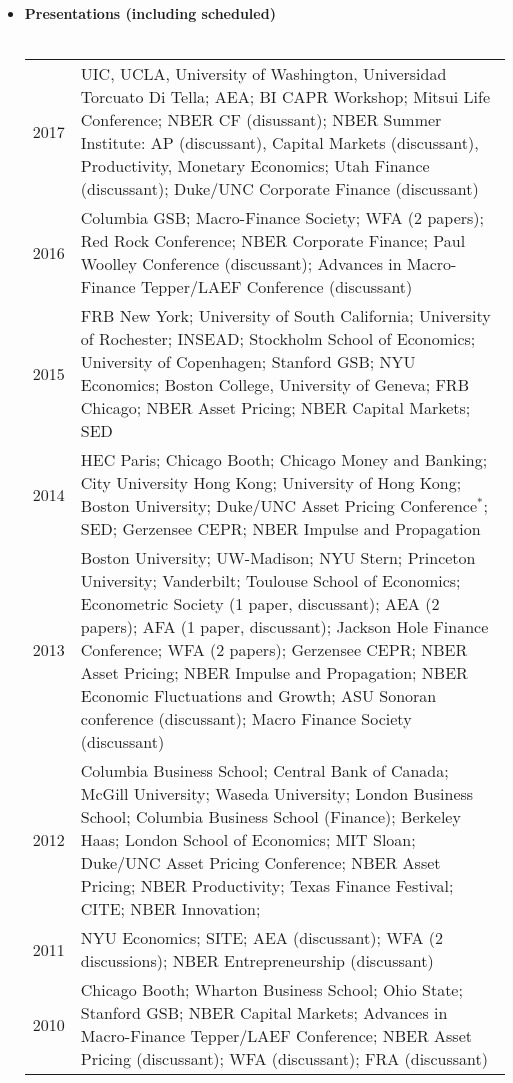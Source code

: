 \documentclass[11pt,letterpaper,serif,overlapped]{res}
\begin{document}
\begin{resume}
\begin{itemize}
\vspace{0.5cm}

\item \textbf{Presentations (including scheduled)} \\ \\
\begin{longtable}{lp{15cm}}
2017 & UIC, UCLA, University of Washington, Universidad Torcuato Di Tella; AEA; BI CAPR Workshop; Mitsui Life Conference; NBER CF (disussant); NBER Summer Institute:  AP (discussant), Capital Markets (discussant),  Productivity, Monetary Economics; Utah Finance (discussant); Duke/UNC Corporate Finance (discussant)\\[0.1cm]
2016 & Columbia GSB;  Macro-Finance Society; WFA (2 papers); Red Rock Conference; NBER Corporate Finance; Paul Woolley Conference (discussant); Advances in Macro-Finance Tepper/LAEF Conference (discussant)\\[0.1cm]
2015 & FRB New York; University of South California; University of Rochester; INSEAD; Stockholm School of Economics; University of Copenhagen; Stanford GSB; NYU Economics; Boston College, University of Geneva; FRB Chicago; NBER Asset Pricing;  NBER Capital Markets; SED\\[0.1cm]
2014 &HEC Paris; Chicago Booth; Chicago Money and Banking; City University Hong Kong; University of Hong Kong; Boston University; Duke/UNC Asset Pricing Conference$^*$; SED; Gerzensee CEPR; NBER Impulse and Propagation\\[0.1cm]
2013 & Boston University; UW-Madison; NYU Stern; Princeton University; Vanderbilt; Toulouse School of Economics;  Econometric Society (1 paper, discussant); AEA (2 papers); AFA (1 paper, discussant); Jackson Hole Finance Conference; WFA (2 papers); Gerzensee CEPR; NBER Asset Pricing; NBER Impulse and Propagation;  NBER Economic Fluctuations and Growth; ASU Sonoran conference (discussant); Macro Finance Society (discussant) \\[0.1cm]
2012 & Columbia Business School; Central Bank of Canada; McGill University; Waseda University; London Business School; Columbia Business School (Finance); Berkeley Haas;  London School of Economics; MIT Sloan; Duke/UNC Asset Pricing Conference; NBER Asset Pricing; NBER Productivity; Texas Finance Festival; CITE; NBER Innovation;\\[0.1cm]
2011 & NYU Economics;  SITE; AEA (discussant); WFA (2 discussions); NBER Entrepreneurship (discussant) \\[0.1cm]
2010 & Chicago Booth; Wharton Business School; Ohio State; Stanford GSB; NBER Capital Markets; Advances in Macro-Finance Tepper/LAEF Conference; NBER Asset Pricing (discussant); WFA (discussant); FRA (discussant)  \\[0.1cm]

\end{longtable}
\end{itemize}
\end{resume}
\end{document}

